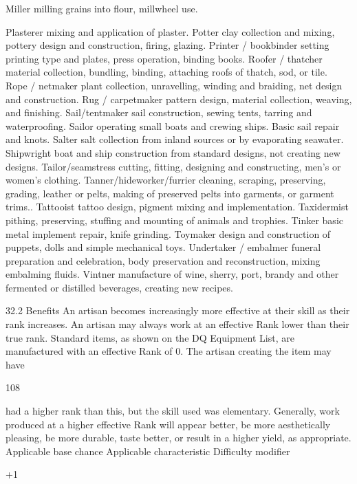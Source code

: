 \documentclass[a4paper]{article}
\begin{document}
\begin{multicols}{3}
Miller milling grains into flour, millwheel use.

Plasterer mixing and application of plaster.
Potter clay collection and mixing, pottery design
and construction, firing, glazing.
Printer / bookbinder setting printing type and
plates, press operation, binding books.
Roofer / thatcher material collection, bundling,
binding, attaching roofs of thatch, sod, or tile.
Rope / netmaker plant collection, unravelling,
winding and braiding, net design and construction.
Rug / carpetmaker pattern design, material collection, weaving, and finishing.
Sail/tentmaker sail construction, sewing tents,
tarring and waterproofing.
Sailor operating small boats and crewing ships.
Basic sail repair and knots.
Salter salt collection from inland sources or by
evaporating seawater.
Shipwright boat and ship construction from standard designs, not creating new designs.
Tailor/seamstress cutting, fitting, designing and
constructing, men’s or women’s clothing.
Tanner/hideworker/furrier cleaning, scraping,
preserving, grading, leather or pelts, making of
preserved pelts into garments, or garment trims..
Tattooist tattoo design, pigment mixing and implementation.
Taxidermist pithing, preserving, stuffing and
mounting of animals and trophies.
Tinker basic metal implement repair, knife grinding.
Toymaker design and construction of puppets,
dolls and simple mechanical toys.
Undertaker / embalmer funeral preparation and
celebration, body preservation and reconstruction,
mixing embalming fluids.
Vintner manufacture of wine, sherry, port, brandy
and other fermented or distilled beverages, creating
new recipes.

32.2 Benefits
An artisan becomes increasingly more effective at
their skill as their rank increases. An artisan may
always work at an effective Rank lower than their
true rank. Standard items, as shown on the DQ
Equipment List, are manufactured with an effective
Rank of 0. The artisan creating the item may have

108

had a higher rank than this, but the skill used was
elementary. Generally, work produced at a higher
effective Rank will appear better, be more aesthetically pleasing, be more durable, taste better, or
result in a higher yield, as appropriate.
Applicable base
chance
Applicable characteristic
Difficulty modifier

+1%


\end{multicols}
\end{document}
